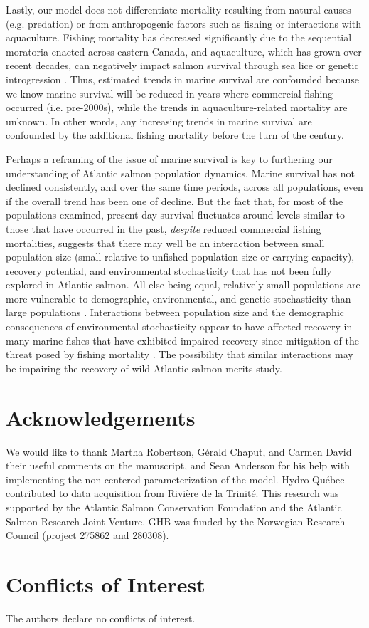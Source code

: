 \documentclass[12pt]{article}
\begin{document}
Lastly, our model does not differentiate mortality resulting from natural
causes (e.g. predation) or from anthropogenic factors such as fishing or
interactions with aquaculture. Fishing mortality has decreased
significantly due to the sequential moratoria enacted across eastern Canada, and
aquaculture, which has grown over recent decades, can negatively impact salmon survival through sea lice
\citep{Shephard2020,Bohn2020} or genetic introgression \citep{Glover2017,Vollset2020}.
Thus, estimated trends in marine survival are confounded because we know marine
survival will be reduced in years where commercial fishing occurred (i.e.
pre-2000s), while the trends in aquaculture-related mortality are unknown.
In other words, any increasing trends in marine survival are confounded by the additional
fishing mortality before the turn of the century.

Perhaps a reframing of the issue of marine survival is key to furthering our
understanding of Atlantic salmon population dynamics. Marine survival has not
declined consistently, and over the same time periods, across all
populations, even if the overall trend has been one of decline.
But the fact that, for most of the populations examined,
present-day survival fluctuates around levels similar to those that have occurred in the past,
\emph{despite} reduced commercial fishing mortalities, suggests
that there may well be an interaction between small population size (small
relative to unfished population size or carrying capacity), recovery
potential, and environmental stochasticity that has not been fully explored in
Atlantic salmon.
All else being equal, relatively small populations are more vulnerable to
demographic, environmental, and genetic stochasticity than large populations
\citep{Lande1993, Hutchings2015}. Interactions between population size and the
demographic consequences of environmental stochasticity appear to have
affected recovery in many marine fishes that have exhibited impaired recovery
since mitigation of the threat posed by fishing mortality
\citep{Hutchings2017, Hutchings2020}. The possibility that similar
interactions may be impairing the recovery of wild Atlantic salmon merits
study.

\section*{Acknowledgements}

We would like to thank Martha Robertson, G\'{e}rald Chaput, and Carmen David
their useful comments on the manuscript, and Sean Anderson for his help with
implementing the non-centered parameterization of the model. Hydro-Québec
contributed to data acquisition from Rivière de la Trinité. This research was
supported by the Atlantic Salmon Conservation Foundation and the Atlantic
Salmon Research Joint Venture.
GHB was funded by the Norwegian Research Council (project 275862 and 280308).

\section*{Conflicts of Interest}

The authors declare no conflicts of interest.



%
\end{document}
